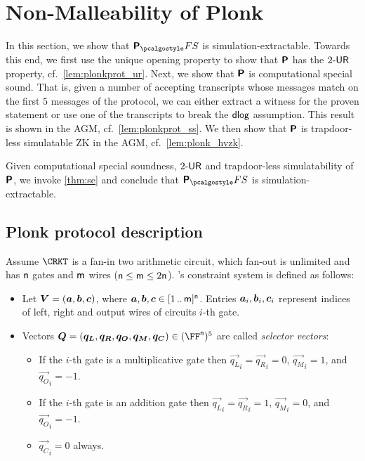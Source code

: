 

\section{Non-Malleability of Plonk} 
\label{sec:plonk}
In this section, we show that $\plonkprotfs$ is simulation-extractable. Towards this end, we first use the unique opening property to show that
$\bm{\mathsf{P}}$ has the ${2\text{-}\mathsf{UR}}$ property,
cf.~\cref{lem:plonkprot_ur}.
Next, we show that $\bm{\mathsf{P}}$ is computational special sound. That is, given a
number of accepting transcripts whose messages match on the first $5$ messages of the
protocol, we can either extract a witness for the proven statement or use
one of the transcripts to break the $\mathsf{dlog}$ assumption. This result is shown in
the AGM, cf.~\cref{lem:plonkprot_ss}. We then show that $\bm{\mathsf{P}}$ is trapdoor-less simulatable ZK in the AGM, cf.~\cref{lem:plonk_hvzk}.

Given computational special soundness, ${2\text{-}\mathsf{UR}}$ and trapdoor-less simulatability of $\bm{\mathsf{P}}$, we invoke \cref{thm:se} and conclude that $\plonkprot_\fs$ is simulation-extractable.

\newcommand{\vql}{\vec{q_{L}}}
\newcommand{\vqr}{\vec{q_{R}}}
\newcommand{\vqm}{\vec{q_{M}}}
\newcommand{\vqo}{\vec{q_{O}}}
\newcommand{\vx}{\vec{x}}
\newcommand{\vqc}{\vec{q_{C}}}

\subsection{Plonk protocol description}
\label{sec:plonk_explained}
Assume $\CRKT$ is a fan-in two arithmetic circuit,
which fan-out is unlimited and has $\mathsf{n}$ gates and $\mathsf{m}$ wires
($\mathsf{n} \leq \mathsf{m} \leq 2\mathsf{n}$). \plonk's constraint
system is defined as follows:
\begin{itemize}
\item Let $\vec{V} = (\va, \vb, \vc)$, where $\va, \vb, \vc
  \in \range{1}{\noofw}^\numberofconstrains$. Entries $\va_i, \vb_i, \vc_i$ represent indices of left,
  right and output wires of circuits $i$-th gate.
\item Vectors $\vec{Q} = (\vql, \vqr, \vqo, \vqm, \vqc) \in
  (\FF^\numberofconstrains)^5$ are called \emph{selector vectors}:
  \begin{itemize}
  \item If the $i$-th gate is a multiplicative gate then $\vql_i = \vqr_i = 0$,
    $\vqm_i = 1$, and $\vqo_i = -1$. 
  \item If the $i$-th gate is an addition gate then $\vql_i = \vqr_i  = 1$, $\vqm_i =
    0$, and $\vqo_i = -1$. 
  \item $\vqc_i = 0$ always. 
  \end{itemize}
\end{itemize}

